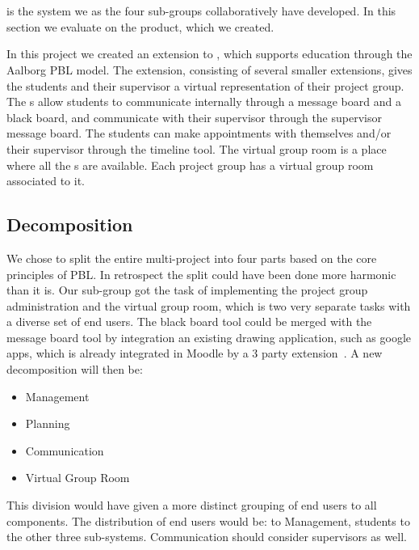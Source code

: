 \section{\system{}}
\label{sec:productsystem}
\system{} is the system we as the four sub-groups collaboratively have developed.
In this section we evaluate on the product, which we created.


In this project we created an extension to \moodle{}, which supports education through the Aalborg PBL model. 
The extension, consisting of several smaller extensions, gives the students and their supervisor a virtual representation of their project group. 
The \detdeandrelaver{}s allow students to communicate internally through a message board and a black board, and communicate with their supervisor through the supervisor message board.
The students can make appointments with themselves and/or their supervisor through the timeline tool.
The virtual group room is a place where all the \detdeandrelaver{}s are available.
Each project group has a virtual group room associated to it.


\subsection{Decomposition}
We chose to split the entire multi-project into four parts based on the core principles of PBL. 
In retrospect the split could have been done more harmonic than it is.
Our sub-group got the task of implementing the project group administration and the virtual group room, which is two very separate tasks with a diverse set of end users. 
The black board tool could be merged with the message board tool by integration an existing drawing application, such as google apps, which is already integrated in Moodle by a 3\rd{} party extension~\cite{moodlegoogleapp}. 
A new decomposition will then be:
\begin{itemize}
	\item Management
	\item Planning
	\item Communication
	\item Virtual Group Room
\end{itemize}

This division would have given a more distinct grouping of end users to all components.
The distribution of end users would be:
\admpers{} to Management, students to the other three sub-systems. 
Communication should consider supervisors as well.




